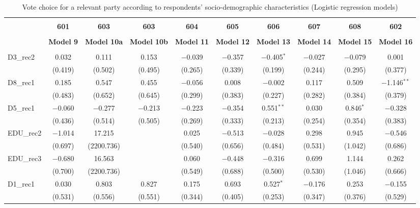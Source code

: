 \documentclass[
]{article}
\begin{document}
\begin{table}[!htbp] \centering 
  \caption{Vote choice for a relevant party according to respondents' 
                       socio-demographic characteristics (Logistic regression models)} 
  \label{table:full_logit_cz} 
\begin{tabular}{@{\extracolsep{5pt}}lccccccccc} 
\\[-1.8ex]\hline \\[-1.8ex] 
 & \textbf{601} & \textbf{603} & \textbf{603} & \textbf{604} & \textbf{605} & \textbf{606} & \textbf{607} & \textbf{608} & \textbf{602} \\ 
\\[-1.8ex] & \textbf{Model 9} & \textbf{Model 10a} & \textbf{Model 10b} & \textbf{Model 11} & \textbf{Model 12} & \textbf{Model 13} & \textbf{Model 14} & \textbf{Model 15} & \textbf{Model 16}\\ 
\hline \\[-1.8ex] 
 D3\_rec2 & 0.032 & 0.111 & 0.153 & $-$0.039 & $-$0.357 & $-$0.405$^{*}$ & $-$0.027 & $-$0.079 & 0.001 \\ 
  & (0.419) & (0.502) & (0.495) & (0.265) & (0.339) & (0.199) & (0.244) & (0.295) & (0.377) \\ 
  D8\_rec1 & 0.185 & 0.547 & 0.455 & $-$0.056 & 0.008 & $-$0.002 & 0.117 & 0.509 & $-$1.146$^{**}$ \\ 
  & (0.483) & (0.652) & (0.645) & (0.299) & (0.383) & (0.227) & (0.282) & (0.384) & (0.379) \\ 
  D5\_rec1 & $-$0.060 & $-$0.277 & $-$0.213 & $-$0.223 & $-$0.354 & 0.551$^{**}$ & 0.030 & 0.846$^{*}$ & $-$0.328 \\ 
  & (0.436) & (0.514) & (0.505) & (0.269) & (0.333) & (0.213) & (0.254) & (0.354) & (0.383) \\ 
  EDU\_rec2 & $-$1.014 & 17.215 &  & 0.025 & $-$0.513 & $-$0.028 & 0.298 & 0.945 & $-$0.546 \\ 
  & (0.697) & (2200.736) &  & (0.540) & (0.656) & (0.484) & (0.531) & (1.042) & (0.686) \\ 
  EDU\_rec3 & $-$0.680 & 16.563 &  & 0.060 & $-$0.448 & $-$0.316 & 0.699 & 1.144 & 0.262 \\ 
  & (0.700) & (2200.736) &  & (0.549) & (0.688) & (0.500) & (0.530) & (1.046) & (0.666) \\ 
  D1\_rec1 & 0.030 & 0.803 & 0.827 & 0.175 & 0.693 & 0.527$^{*}$ & $-$0.176 & 0.253 & $-$0.155 \\ 
  & (0.531) & (0.556) & (0.551) & (0.344) & (0.405) & (0.253) & (0.347) & (0.376) & (0.529) \\ 

\end{tabular}
\end{table}
\end{document}
